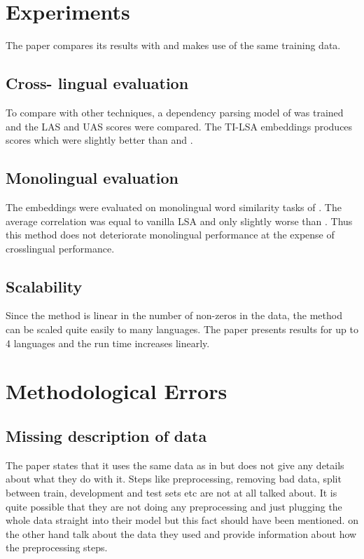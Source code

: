 \documentclass[11pt]{article}
\begin{document}
\section{Experiments}
The paper compares its results with \cite{faruqui2014improving} and makes use of the same training data.
\subsection{Cross- lingual evaluation}
To compare with other techniques, a dependency parsing model of \cite{guo2015cross} was trained and the LAS and UAS scores were compared. The TI-LSA embeddings produces scores which were slightly better than \cite{faruqui2014improving} and \cite{guo2015cross}.

\subsection{Monolingual evaluation}
The embeddings were evaluated on monolingual word similarity tasks of \cite{faruqui2014community}. The average correlation was equal to vanilla LSA and only slightly worse than \cite{faruqui2014improving}. Thus this method does not deteriorate monolingual performance at the expense of crosslingual performance.

\subsection{Scalability}
Since the method is linear in the number of non-zeros in the data, the method can be scaled quite easily to many languages. The paper presents results for up to 4 languages and the run time increases linearly.


\section{Methodological Errors}
\subsection{Missing description of data} \label{missingdata}
The paper states that it uses the same data as in \cite{faruqui2014improving} but does not give any details about what they do with it. Steps like preprocessing, removing bad data, split between train, development and test sets etc are not at all talked about. It is quite possible that they are not doing any preprocessing and just plugging the whole data straight into their model but this fact should have been mentioned. \cite{faruqui2014improving} on the other hand talk about the data they used and provide information about how the preprocessing steps.
\end{document}
